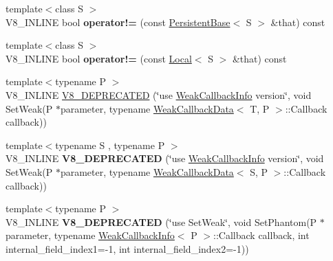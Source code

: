 \begin{DoxyCompactItemize}
\item 
{\footnotesize template$<$class S $>$ }\\V8\+\_\+\+I\+N\+L\+I\+NE bool {\bfseries operator!=} (const \hyperlink{classv8_1_1_persistent_base}{Persistent\+Base}$<$ S $>$ \&that) const \hypertarget{classv8_1_1_persistent_base_a5bfacec9ab828f9aa7abdb980481589a}{}\label{classv8_1_1_persistent_base_a5bfacec9ab828f9aa7abdb980481589a}

\item 
{\footnotesize template$<$class S $>$ }\\V8\+\_\+\+I\+N\+L\+I\+NE bool {\bfseries operator!=} (const \hyperlink{classv8_1_1_local}{Local}$<$ S $>$ \&that) const \hypertarget{classv8_1_1_persistent_base_a467b78e40a53fb8324369d8a7a147800}{}\label{classv8_1_1_persistent_base_a467b78e40a53fb8324369d8a7a147800}

\item 
{\footnotesize template$<$typename P $>$ }\\V8\+\_\+\+I\+N\+L\+I\+NE \hyperlink{classv8_1_1_persistent_base_a64bcb00b5b075107304e0f1a867d15d4}{V8\+\_\+\+D\+E\+P\+R\+E\+C\+A\+T\+ED} (\char`\"{}use \hyperlink{classv8_1_1_weak_callback_info}{Weak\+Callback\+Info} version\char`\"{}, void Set\+Weak(P $\ast$parameter,                                                                   typename \hyperlink{classv8_1_1_weak_callback_data}{Weak\+Callback\+Data}$<$ T, P $>$\+::Callback callback))
\item 
{\footnotesize template$<$typename S , typename P $>$ }\\V8\+\_\+\+I\+N\+L\+I\+NE {\bfseries V8\+\_\+\+D\+E\+P\+R\+E\+C\+A\+T\+ED} (\char`\"{}use \hyperlink{classv8_1_1_weak_callback_info}{Weak\+Callback\+Info} version\char`\"{}, void Set\+Weak(P $\ast$parameter,                                                                   typename \hyperlink{classv8_1_1_weak_callback_data}{Weak\+Callback\+Data}$<$ S, P $>$\+::Callback callback))\hypertarget{classv8_1_1_persistent_base_a1e4aaa31c63db650c6db3bf6b976e8a1}{}\label{classv8_1_1_persistent_base_a1e4aaa31c63db650c6db3bf6b976e8a1}

\item 
{\footnotesize template$<$typename P $>$ }\\V8\+\_\+\+I\+N\+L\+I\+NE {\bfseries V8\+\_\+\+D\+E\+P\+R\+E\+C\+A\+T\+ED} (\char`\"{}use Set\+Weak\char`\"{}, void Set\+Phantom(P $\ast$parameter,                                                                               typename \hyperlink{classv8_1_1_weak_callback_info}{Weak\+Callback\+Info}$<$ P $>$\+::Callback callback,                                                                               int internal\+\_\+field\+\_\+index1=-\/1,                                                                               int internal\+\_\+field\+\_\+index2=-\/1))\hypertarget{classv8_1_1_persistent_base_ae717cd28f0b6f52a705e24a8b3b49b19}{}\label{classv8_1_1_persistent_base_ae717cd28f0b6f52a705e24a8b3b49b19}


\end{DoxyCompactItemize}
